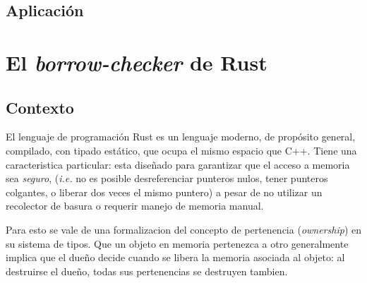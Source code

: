 \documentclass[12pt, a4paper]{article}
\begin{document}
\subsection{Aplicación}

\section{El \textit{borrow-checker} de Rust}

\subsection{Contexto}

El lenguaje de programación Rust es un lenguaje moderno, de propósito general, compilado, con tipado estático, que ocupa el mismo espacio que C++. 
Tiene una caracteristica particular: esta diseñado para garantizar que el acceso a memoria sea \textit{seguro}, (\textit{i.e.} no es posible desreferenciar punteros nulos, tener punteros colgantes, o liberar dos veces el mismo puntero) a pesar de no utilizar un recolector de basura o requerir manejo de memoria manual. 

Para esto se vale de una formalizacion del concepto de pertenencia (\textit{ownership}) en su sistema de tipos. 
Que un objeto en memoria pertenezca a otro generalmente implica que el dueño decide cuando se libera la memoria asociada al objeto: al destruirse el dueño, todas sus pertenencias se destruyen tambien. 


\end{document}
